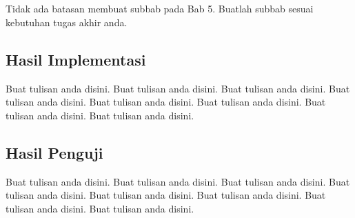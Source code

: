 %
%
%
%

\chapter{\babLima}
Tidak ada batasan membuat subbab pada Bab 5. Buatlah subbab sesuai kebutuhan tugas akhir anda.

\section{Hasil Implementasi}
Buat tulisan anda disini. Buat tulisan anda disini. Buat tulisan anda disini. Buat tulisan anda disini. Buat tulisan anda disini. Buat tulisan anda disini. Buat tulisan anda disini. Buat tulisan anda disini.

\section{Hasil Penguji}
Buat tulisan anda disini. Buat tulisan anda disini. Buat tulisan anda disini. Buat tulisan anda disini. Buat tulisan anda disini. Buat tulisan anda disini. Buat tulisan anda disini. Buat tulisan anda disini.